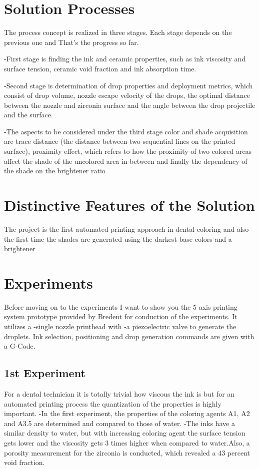 \chapter{Solution Processes}
\label{sec:Lösungsprozesse}
The process concept is realized in three stages. Each stage depends on the previous one and That’s the progress so far.

-First stage is finding the ink and ceramic properties, such as ink viscosity and surface tension, ceramic void fraction and ink absorption time.

-Second stage is determination of drop properties and deployment metrics, which consist of drop volume, nozzle escape velocity of the drops, the optimal distance between the nozzle and zirconia surface and the angle between the drop projectile and the surface.

-The aspects to be considered under the third stage color and shade acquisition are trace distance (the distance between two sequential lines on the printed surface), proximity effect, which refers to how the proximity of two colored areas affect the shade of the uncolored area in between and finally the dependency of the shade on the brightener ratio


\chapter{Distinctive Features of the Solution}
\label{sec:Unterscheidungsmerkmale}
The project is the first automated printing approach in dental coloring and also the first time the shades are generated using the darkest base colors and a brightener




\chapter{Experiments}

Before moving on to the experiments I want to show you the 5 axis printing system prototype provided by Bredent for conduction of the experiments. 
It utilizes a 
-single nozzle printhead  with
-a piezoelectric valve to generate the droplets. 
Ink selection, positioning and drop generation commands are given with a G-Code.


\section{1st Experiment}
For a dental technician it is totally trivial how viscous the ink is but for an automated printing  process the quantization of the properties is highly important.
-In the first experiment, the properties of the coloring agents A1, A2 and A3.5 are determined and compared to those of water.
-The inks have a similar density to water, but with increasing coloring agent the surface tension gets lower and the viscosity gets 3 times higher when compared to water.Also, a porosity measurement for the zirconia is conducted, which revealed a 43 percent void fraction.
